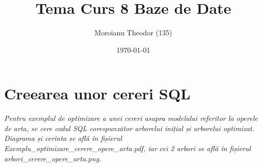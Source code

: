 \documentclass[a4paper,12pt]{article}
\begin{document}
	
	\title{Tema Curs 8 Baze de Date}
	\author{Moroianu Theodor (135)}
	\date{\today}
	\maketitle

	\section{Creearea unor cereri SQL}
		\textit{Pentru exemplul de optimizare a unei cereri asupra modelului referitor la operele de arta, se cere codul SQL corespunzător arborelui inițial și arborelui optimizat. Diagrama și cerinta se află în fișierul Exemplu\_optimizare\_cerere\_opere\_arta.pdf, iar cei 2 arbori se află în fișierul arbori\_cerere\_opere\_arta.png.}\\
		\newline
\end{document}
